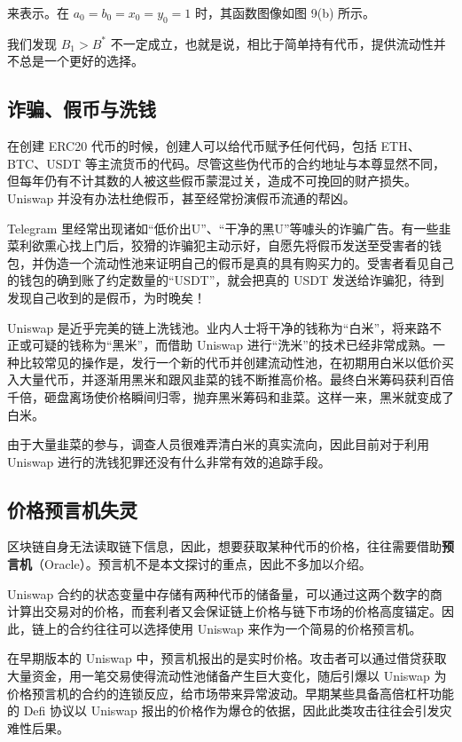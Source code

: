\documentclass[12pt, a4paper, oneside]{ctexart}
\begin{document}
\noindent 来表示。在 $a_0=b_0=x_0=y_0=1$ 时，其函数图像如图 9(b) 所示。

我们发现 $B_1>B^*$ 不一定成立，也就是说，相比于简单持有代币，提供流动性并不总是一个更好的选择。

\subsection{诈骗、假币与洗钱}

在创建 ERC20 代币的时候，创建人可以给代币赋予任何代码，包括 ETH、BTC、USDT 等主流货币的代码。尽管这些伪代币的合约地址与本尊显然不同，但每年仍有不计其数的人被这些假币蒙混过关，造成不可挽回的财产损失。 Uniswap 并没有办法杜绝假币，甚至经常扮演假币流通的帮凶。

Telegram 里经常出现诸如“低价出U”、“干净的黑U”等噱头的诈骗广告。有一些韭菜利欲熏心找上门后，狡猾的诈骗犯主动示好，自愿先将假币发送至受害者的钱包，并伪造一个流动性池来证明自己的假币是真的具有购买力的。受害者看见自己的钱包的确到账了约定数量的“USDT”，就会把真的 USDT 发送给诈骗犯，待到发现自己收到的是假币，为时晚矣！

Uniswap 是近乎完美的链上洗钱池。业内人士将干净的钱称为“白米”，将来路不正或可疑的钱称为“黑米”，而借助 Uniswap 进行“洗米”的技术已经非常成熟。一种比较常见的操作是，发行一个新的代币并创建流动性池，在初期用白米以低价买入大量代币，并逐渐用黑米和跟风韭菜的钱不断推高价格。最终白米筹码获利百倍千倍，砸盘离场使价格瞬间归零，抛弃黑米筹码和韭菜。这样一来，黑米就变成了白米。

由于大量韭菜的参与，调查人员很难弄清白米的真实流向，因此目前对于利用 Uniswap 进行的洗钱犯罪还没有什么非常有效的追踪手段。

\subsection{价格预言机失灵}

区块链自身无法读取链下信息，因此，想要获取某种代币的价格，往往需要借助\textbf{预言机}（Oracle）。预言机不是本文探讨的重点，因此不多加以介绍。

Uniswap 合约的状态变量中存储有两种代币的储备量，可以通过这两个数字的商计算出交易对的价格，而套利者又会保证链上价格与链下市场的价格高度锚定。因此，链上的合约往往可以选择使用 Uniswap 来作为一个简易的价格预言机。

在早期版本的 Uniswap 中，预言机报出的是实时价格。攻击者可以通过借贷获取大量资金，用一笔交易使得流动性池储备产生巨大变化，随后引爆以 Uniswap 为价格预言机的合约的连锁反应，给市场带来异常波动。早期某些具备高倍杠杆功能的 Defi 协议以 Uniswap 报出的价格作为爆仓的依据，因此此类攻击往往会引发灾难性后果。
\end{document}
